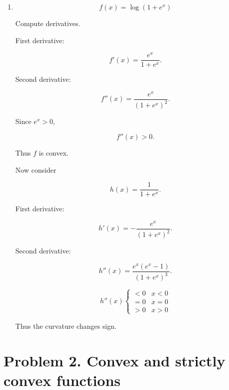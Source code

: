 \documentclass[
  12pt,
]{fphw}
\begin{document}
\begin{enumerate}
\item[(d)]

\[
f(x)=\log(1+e^x)
\]

Compute derivatives.

First derivative:

\[
f'(x)=\frac{e^x}{1+e^x}.
\]

Second derivative:

\[
f''(x)=\frac{e^x}{(1+e^x)^2}.
\]

Since $e^x>0$,

\[
f''(x)>0.
\]

Thus $f$ is convex.

Now consider

\[
h(x)=\frac{1}{1+e^x}.
\]

First derivative:

\[
h'(x)= -\frac{e^x}{(1+e^x)^2}.
\]

Second derivative:

\[
h''(x)=
\frac{e^x(e^x-1)}{(1+e^x)^3}.
\]


\[
h''(x)
\begin{cases}
<0 & x<0 \\
=0 & x=0 \\
>0 & x>0
\end{cases}
\]

Thus the curvature changes sign.
\end{enumerate}

\section*{Problem 2. Convex and strictly convex functions}
\end{document}
